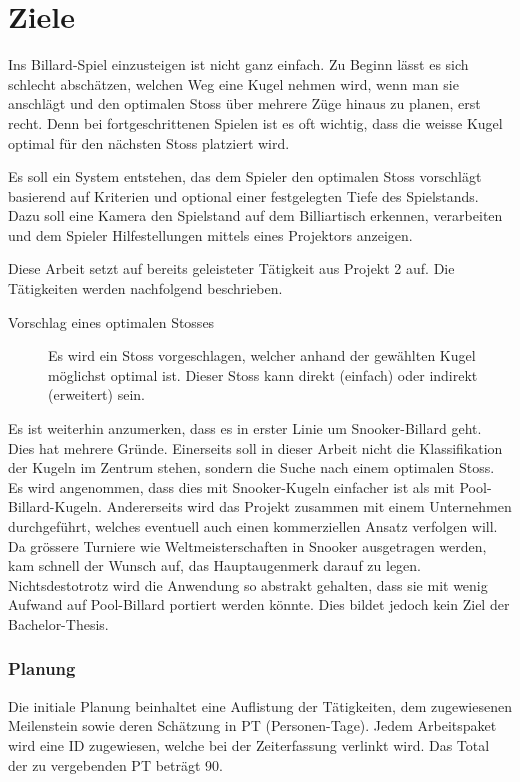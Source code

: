 \chapter{Ziele}
Ins Billard-Spiel einzusteigen ist nicht ganz einfach. Zu Beginn lässt es sich schlecht abschätzen,
welchen Weg eine Kugel nehmen wird, wenn man sie anschlägt und den optimalen Stoss über mehrere Züge hinaus zu planen,
erst recht. Denn bei fortgeschrittenen Spielen ist es oft wichtig, dass die weisse Kugel optimal für den nächsten Stoss
platziert wird.

Es soll ein System entstehen, das dem Spieler den optimalen Stoss vorschlägt basierend auf Kriterien und
optional einer festgelegten Tiefe des Spielstands. Dazu soll eine Kamera den Spielstand auf dem Billiartisch erkennen, verarbeiten und
dem Spieler Hilfestellungen mittels eines Projektors anzeigen.

Diese Arbeit setzt auf bereits geleisteter Tätigkeit aus \glqq{}Projekt 2\grqq{} auf\cite{project2:ziele}. Die
Tätigkeiten werden nachfolgend beschrieben.
\begin{description}
    \item[Vorschlag eines optimalen Stosses] Es wird ein Stoss vorgeschlagen, welcher anhand der gewählten Kugel
    möglichst optimal ist. Dieser Stoss kann direkt (einfach) oder indirekt (erweitert) sein.
\end{description}

Es ist weiterhin anzumerken, dass es in erster Linie um Snooker-Billard geht. Dies hat mehrere Gründe. Einerseits soll
in dieser Arbeit nicht die Klassifikation der Kugeln im Zentrum stehen, sondern die Suche nach einem optimalen Stoss.
Es wird angenommen, dass dies mit Snooker-Kugeln einfacher ist als mit Pool-Billard-Kugeln. Andererseits wird das
Projekt zusammen mit einem Unternehmen durchgeführt, welches eventuell auch einen kommerziellen Ansatz verfolgen
will. Da grössere Turniere wie Weltmeisterschaften in Snooker ausgetragen werden, kam schnell der Wunsch auf, das
Hauptaugenmerk darauf zu legen. Nichtsdestotrotz wird die Anwendung so abstrakt gehalten, dass sie mit wenig Aufwand
auf Pool-Billard portiert werden könnte. Dies bildet jedoch kein Ziel der Bachelor-Thesis.

\newpage

\subsection{Planung}
Die initiale Planung beinhaltet eine Auflistung der Tätigkeiten, dem zugewiesenen Meilenstein sowie
deren Schätzung in PT (Personen-Tage). Jedem Arbeitspaket wird eine ID zugewiesen,
welche bei der Zeiterfassung verlinkt wird. Das Total der zu vergebenden PT beträgt 90.

